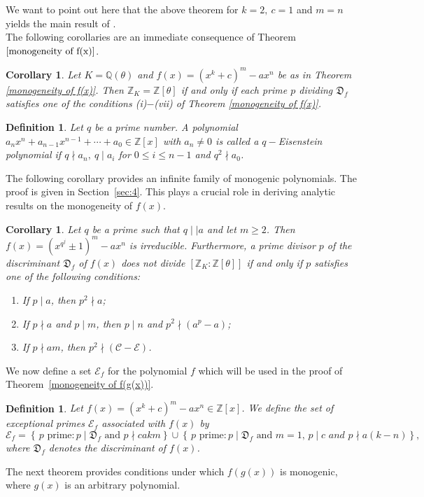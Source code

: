 \documentclass[table]{amsart}
\newcommand{\scrE}{\mathscr{E}}
\newtheorem{definition}[theorem]{Definition}
\newtheorem{corollary}[theorem]{Corollary}
\newcommand{\Z}{\mathbb{Z}}
\newcommand{\Q}{\mathbb{Q}}
\newcommand{\D}{\mathfrak{D}}
\numberwithin{equation}{section}
\begin{document}
We want to point out here that the above theorem for $k=2,~c=1$ and $m=n$ yields the main result of \cite{BNW026}.\\
The following corollaries are an immediate consequence of  Theorem $\ref{monogeneity of f(x)}$. 
\begin{corollary}\label {Cor:1.3}
	Let $K = \Q(\theta)$ and $f(x) = (x^k+c)^m-ax^n$ be as in Theorem \ref{monogeneity of f(x)}. Then $\Z_{K} = \Z[\theta]$ if and only if each prime $p$ dividing $\D_f$ satisfies one of the conditions \textup{(i)$-$(vii)} of Theorem \ref{monogeneity of f(x)}.
\end{corollary}


\begin{definition}Let $q$ be a prime number. A polynomial $a_nx^n+a_{n-1}x^{n-1}+\cdots+a_{0}\in \Z[x]$ with $a_n\neq 0$ is called a $q-$Eisenstein polynomial  if $q\nmid a_n,~q\mid a_i$ for $0\leq i\leq n-1$ and $q^2\nmid a_{0}$.
\end{definition}
The following corollary provides an infinite family of monogenic  polynomials. 
The proof is given in Section~\ref{sec:4}. This plays a crucial role in deriving analytic results on the monogeneity of $f(x)$.
\begin{corollary}\label{6.1lemma}
Let $q$ be a prime such that $q \mid\mid a$ and let $m \ge 2$. Then $f(x) = (x^{q^j} \pm 1)^m - a x^n$ is irreducible. Furthermore, a prime divisor $p$ of the discriminant  $\D_f$ of $f(x)$ does not divide $[\Z_{K} : \Z[\theta]]$ if and only if $p$  satisfies one of the following conditions: 
\begin{enumerate}
    \item If $p\mid a$, then $p^2\nmid a$;
    \item If $p \nmid a$ and $p \mid m$, then $p\mid n$ and  $p^2 \nmid (a^p - a)$;
    \item If $p \nmid am$, then $p^2 \nmid (\mathcal{C} - \mathcal{E})$.
\end{enumerate}
\end{corollary}
 We now define a set $\scrE_f$ for the polynomial $f$ which will be used in the proof of Theorem~\ref{monogeneity of f(g(x))}.

\begin{definition}
Let $f(x) =(x^k+c)^m-ax^n \in \mathbb{Z}[x]$. 
We define the \emph{set of exceptional primes} \(\scrE_f\) associated with \(f(x)\) by
\[  \scrE_f = \left\{\, p \text{ prime} : p \mid \D_f \text{ and } p \nmid cak m \right\}\cup\left\{\, p \text{ prime} : p \mid \D_f \text{ and } m=1,\,p\mid c \textit{ and } p\nmid a(k-n)\right\}, \]
where \(\D_f\) denotes the discriminant of \(f(x)\).
\end{definition}
The next theorem provides conditions under which $f(g(x))$ is monogenic, where $g(x)$ is an arbitrary polynomial.
\end{document}
